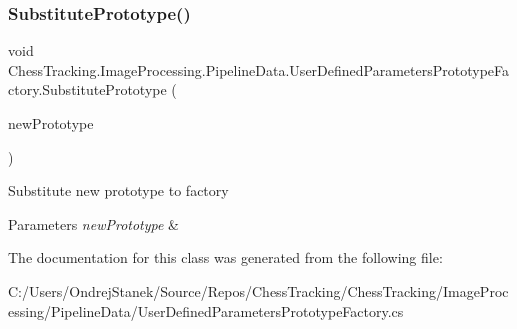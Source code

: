 \subsubsection{\texorpdfstring{SubstitutePrototype()}{SubstitutePrototype()}}
{\footnotesize\ttfamily void Chess\+Tracking.\+Image\+Processing.\+Pipeline\+Data.\+User\+Defined\+Parameters\+Prototype\+Factory.\+Substitute\+Prototype (\begin{DoxyParamCaption}\item[{\mbox{\hyperlink{class_chess_tracking_1_1_image_processing_1_1_pipeline_data_1_1_user_defined_parameters}{User\+Defined\+Parameters}}}]{new\+Prototype }\end{DoxyParamCaption})}



Substitute new prototype to factory 


\begin{DoxyParams}{Parameters}
{\em new\+Prototype} & \\
\hline
\end{DoxyParams}


The documentation for this class was generated from the following file\+:\begin{DoxyCompactItemize}
\item 
C\+:/\+Users/\+Ondrej\+Stanek/\+Source/\+Repos/\+Chess\+Tracking/\+Chess\+Tracking/\+Image\+Processing/\+Pipeline\+Data/User\+Defined\+Parameters\+Prototype\+Factory.\+cs\end{DoxyCompactItemize}
